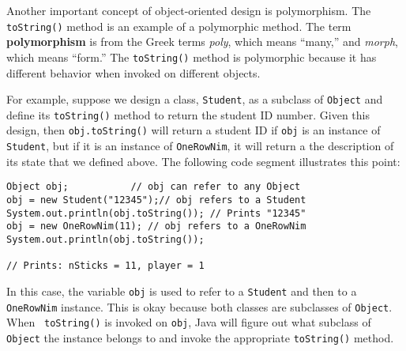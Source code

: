 



Another important concept of object-oriented design is polymorphism.
The {\tt toString()} method is an example of a polymorphic method. The
term {\bf polymorphism} is from the Greek terms {\it poly}, which means
``many,'' and {\it morph}, which means ``form.'' The {\tt toString()}
method is polymorphic because it has different behavior when invoked
on different objects.

For example, suppose we design a class, {\tt Student}, as a subclass
of {\tt Object} and define its {\tt toString()} method to return the
student ID number.  Given this design, then {\tt obj.toString()} will
return a student ID if {\tt obj} is an instance of {\tt Student}, but
if it is an instance of {\tt OneRowNim}, it will return a the
description of its state that we defined above. The following code
segment illustrates this point:

\begin{jjjlisting}
\begin{lstlisting}
Object obj;           // obj can refer to any Object
obj = new Student("12345");// obj refers to a Student
System.out.println(obj.toString()); // Prints "12345"
obj = new OneRowNim(11); // obj refers to a OneRowNim
System.out.println(obj.toString());

// Prints: nSticks = 11, player = 1
\end{lstlisting}
\end{jjjlisting}

\noindent In this case, the variable {\tt obj} is used to refer to a
{\tt Student} and then to a {\tt OneRowNim} instance. This is okay
because both classes are subclasses of {\tt Object}. When {\tt
toString()} is invoked on {\tt obj}, Java will figure out what
subclass of {\tt Object} the instance belongs to and invoke the
appropriate {\tt toString()} method.

